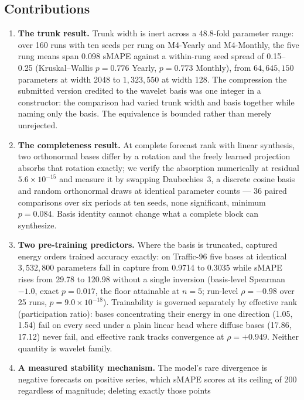 \subsection{Contributions}

\begin{enumerate}
\item \textbf{The trunk result.} Trunk width is inert across a 48.8-fold
  parameter range: over 160 runs with ten seeds per rung on M4-Yearly and
  M4-Monthly, the five rung means span 0.098 sMAPE against a within-rung
  seed spread of 0.15--0.25 (Kruskal--Wallis $p = 0.776$ Yearly,
  $p = 0.773$ Monthly), from $64{,}645{,}150$ parameters at width 2048 to
  $1{,}323{,}550$ at width 128. The compression the submitted version
  credited to the wavelet basis was one integer in a constructor: the
  comparison had varied trunk width and basis together while naming only the
  basis. The equivalence is bounded rather than merely unrejected.
\item \textbf{The completeness result.} At complete forecast rank with
  linear synthesis, two orthonormal bases differ by a rotation and the
  freely learned projection absorbs that rotation exactly; we verify the
  absorption numerically at residual $5.6\times 10^{-15}$ and measure it by
  swapping Daubechies~3, a discrete cosine basis and random orthonormal
  draws at identical parameter counts --- 36 paired comparisons over six
  periods at ten seeds, none significant, minimum $p = 0.084$. Basis
  identity cannot change what a complete block can synthesize.
\item \textbf{Two pre-training predictors.} Where the basis is truncated,
  captured energy orders trained accuracy exactly: on Traffic-96 five bases
  at identical $3{,}532{,}800$ parameters fall in capture from 0.9714 to
  0.3035 while sMAPE rises from 29.78 to 120.98 without a single inversion
  (basis-level Spearman $-1.0$, exact $p = 0.017$, the floor attainable at
  $n = 5$; run-level $\rho = -0.98$ over 25 runs, $p = 9.0\times 10^{-18}$).
  Trainability is governed separately by effective rank (participation
  ratio): bases concentrating their energy in one direction (1.05, 1.54)
  fail on every seed under a plain linear head where diffuse bases (17.86,
  17.12) never fail, and effective rank tracks convergence at
  $\rho = +0.949$. Neither quantity is wavelet family.
\item \textbf{A measured stability mechanism.} The model's rare divergence
  is negative forecasts on positive series, which sMAPE scores at its
  ceiling of 200 regardless of magnitude; deleting exactly those points

\end{enumerate}
